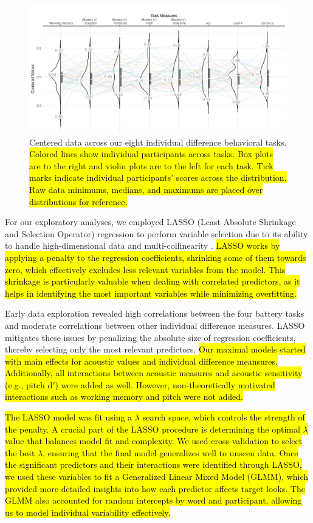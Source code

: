 \begin{figure}[H]
  \centering
  \includegraphics[width=1\linewidth]{visuals/plot_raw_task.jpeg}
  \caption{Centered data across our eight individual difference behavioral tasks. \hl{Colored lines show individual participants across tasks. Box plots are to the right and violin plots are to the left for each task. Tick marks indicate individual participants' scores across the distribution. Raw data minimums, medians, and maximums are placed over distributions  for reference.}}
  \label{fig:plot_raw_task}
\end{figure}


For our exploratory analyses, we employed LASSO (Least Absolute Shrinkage and Selection Operator) regression to perform variable selection due to its ability to handle high-dimensional data and multi-collinearity \citep{Zhang2020, Tibshirani1996}. \hl{LASSO works by applying a penalty to the regression coefficients, shrinking some of them towards zero, which effectively excludes less relevant variables from the model. This shrinkage is particularly valuable when dealing with correlated predictors, as it helps in identifying the most important variables while minimizing overfitting.}

Early data exploration revealed high correlations between the four battery tasks and moderate correlations between other individual difference measures. LASSO mitigates these issues by penalizing the absolute size of regression coefficients, thereby selecting only the most relevant predictors. \hl{Our maximal models started with main effects for acoustic values and individual difference meansures. Additionally, all interactions between acoustic measures and acoustic sensitivity (e.g., pitch d$'$) were added as well. However, non-theoretically motivated interactions such as working memory and pitch were not added.}

\hl{The LASSO model was fit using a $\lambda$ search space, which controls the strength of the penalty. A crucial part of the LASSO procedure is determining the optimal $\lambda$ value that balances model fit and complexity. We used cross-validation to select the best $\lambda$, ensuring that the final model generalizes well to unseen data. Once the significant predictors and their interactions were identified through LASSO, we used these variables to fit a Generalized Linear Mixed Model (GLMM), which provided more detailed insights into how each predictor affects target looks. The GLMM also accounted for random intercepts by word and participant, allowing us to model individual variability effectively.}

